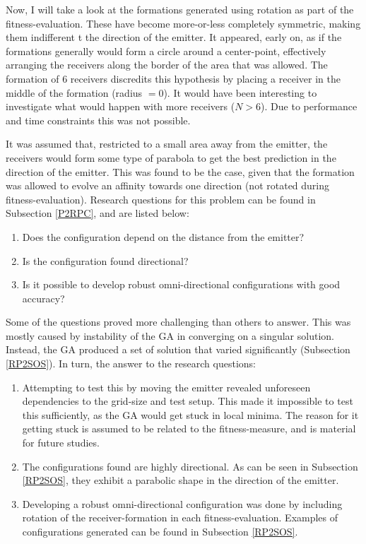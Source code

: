 \documentclass[10pt,a4paper]{book}
\begin{document}
Now, I will take a look at the formations generated using rotation as part of the fitness-evaluation. These have become more-or-less completely symmetric, making them indifferent t the direction of the emitter. It appeared, early on, as if the formations generally would form a circle around a center-point, effectively arranging the receivers along the border of the area that was allowed. The formation of 6 receivers discredits this hypothesis by placing a receiver in the middle of the formation (radius $= 0$). It would have been interesting to investigate what would happen with more receivers ($N > 6$). Due to performance and time constraints this was not possible.

It was assumed that, restricted to a small area away from the emitter, the receivers would form some type of parabola to get the best prediction in the direction of the emitter. This was found to be the case, given that the formation was allowed to evolve an affinity towards one direction (not rotated during fitness-evaluation). Research questions for this problem can be found in Subsection \ref{P2RPC}, and are listed below:

\begin{enumerate}
\item Does the configuration depend on the distance from the emitter?
\item Is the configuration found directional?
\item Is it possible to develop robust omni-directional configurations with good accuracy?
\end{enumerate}

Some of the questions proved more challenging than others to answer. This was mostly caused by instability of the \gls{GA} in converging on a singular solution. Instead, the \gls{GA} produced a set of solution that varied significantly (Subsection \ref{RP2SOS}). In turn, the answer to the research questions:

\begin{enumerate}
\item Attempting to test this by moving the emitter revealed unforeseen dependencies to the grid-size and test setup. This made it impossible to test this sufficiently, as the \gls{GA} would get stuck in local minima. The reason for it getting stuck is assumed to be related to the fitness-measure, and is material for future studies.
\item The configurations found are highly directional. As can be seen in Subsection \ref{RP2SOS}, they exhibit a parabolic shape in the direction of the emitter. 
\item Developing a robust omni-directional configuration was done by including rotation of the receiver-formation in each fitness-evaluation. Examples of configurations generated can be found in Subsection \ref{RP2SOS}.
\end{enumerate}
\end{document}
